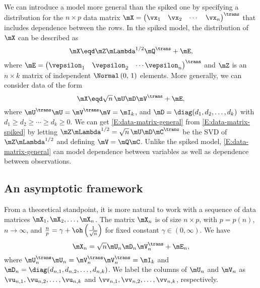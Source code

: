 We can introduce a model more general than the spiked one by specifying
a distribution for the $n\times p$ data matrix 
\(
    \mX
    =
    \left(
    \begin{matrix}
        \vx_1 &
        \vx_2 &
        \cdots &
        \vx_n
    \end{matrix}
    \right)^\trans
\)
that includes dependence between the rows.  In the spiked model, the
distribution of $\mX$ can be described as
\begin{equation}\label{E:data-matrix-spiked}
    \mX
        \eqd
        \mZ
        \mLambda^{1/2}
        \mQ^\trans
        +
        \mE,
\end{equation}
where 
\(
    \mE 
        = 
        \left(
        \begin{matrix}
            \vepsilon_1 & \vepsilon_2 & \cdots \vepsilon_n
        \end{matrix}
        \right)^\trans
\)
and $\mZ$ is an $n \times k$ matrix of independent 
$\Normal \left( 0, \, 1 \right)$ elements.  More generally, we can consider
data of the form
\begin{equation}\label{E:data-matrix-general}
    \mX
        \eqd
            \sqrt{n} \,
            \mU
            \mD
            \mV^\trans
            +
            \mE,
\end{equation}
where $\mU^\trans \mU = \mV^\trans \mV = \mI_k$, and 
$\mD = \diag( d_1, d_2, \ldots, d_k )$ with 
$d_1 \geq d_2 \geq \cdots \geq d_k \geq 0$.  
We can get \eqref{E:data-matrix-general}  from \eqref{E:data-matrix-spiked} by letting $\mZ \mLambda^{1/2} = \sqrt{n} \, \mU \mD \mC^\trans$ be the SVD of $\mZ \mLambda^{1/2}$ and defining $\mV = \mQ \mC$.  Unlike the spiked model, \eqref{E:data-matrix-general} can model dependence between variables as well as dependence between observations.

\subsection{An asymptotic framework}

From a theoretical standpoint, it is more natural to work with a sequence
of data matrices $\mX_1, \mX_2, \ldots, \mX_n$.  
The matrix $\mX_n$ is of size $n \times p$, with $p = p(n)$, $n \to \infty$,
and $\frac{n}{p} = \gamma + \oh\left( \frac{1}{\sqrt{n}} \right)$ for fixed
constant $\gamma \in (0, \infty)$.   We have
\begin{equation}
    \mX_n = \sqrt{n} \mU_n \mD_n \mV_n^\trans + \mE_n,
\end{equation}
where $\mU_n^\trans \mU_n = \mV_n^\trans \mV_n^\trans = \mI_k$ and
$\mD_n = \diag( d_{n,1}, d_{n,2}, \ldots, d_{n,k})$.  We label the columns
of $\mU_n$ and $\mV_n$ as $\vu_{n,1}, \vu_{n,2}, \ldots, \vu_{n,k}$ and
$\vv_{n,1}, \vv_{n,2}, \ldots, \vv_{n,k}$, respectively.

